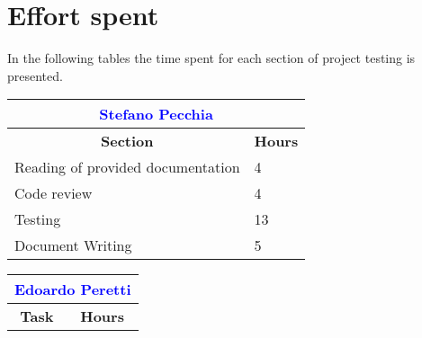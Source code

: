 \section{Effort spent}
In the following tables the time spent for each section of project testing is presented.

\renewcommand\arraystretch{1.5}
\begin{table}[ht]
\centering
\begin{tabular}{|l|l|}
\multicolumn{2}{c}{\textcolor{Blue}{\textbf{Stefano Pecchia}}} \\\hline
\multicolumn{1}{|c|}{\textbf{Section}} & \multicolumn{1}{|c|}{\textbf{Hours}} \\\hline
    Reading of provided documentation & 4
    \\ \hline
    Code review & 4
    \\ \hline
    Testing & 13
      \\ \hline 
    Document Writing & 5
		\\ \hline

	\end{tabular}
	
	 \vspace{2.5em}
	\begin{tabular}{|l|l|}
\multicolumn{2}{c}{\textcolor{Blue}{\textbf{Edoardo Peretti}}} \\\hline
\multicolumn{1}{|c|}{\textbf{Task}} & \multicolumn{1}{|c|}{\textbf{Hours}} \\\hline

\hline
\end{tabular}
\end{table}